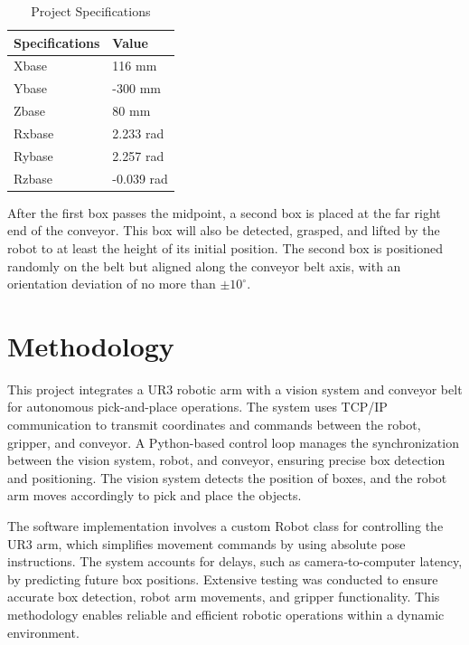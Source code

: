 \documentclass[a4paper, 10pt]{article}
\begin{document}
\renewcommand{\arraystretch}{1.1}
\begin{table}[h]
    \centering
    \caption{Project Specifications}
    \begin{tabular}{|C{7cm}|C{7cm}|}
        \hline
        \textbf{Specifications} & \textbf{Value} \\
        \hline
        Xbase   & 116 mm   \\
        \hline
        Ybase     & -300 mm     \\
        \hline
        Zbase & 80 mm \\
        \hline
        Rxbase   & 2.233 rad   \\
        \hline
        Rybase   & 2.257 rad \\
        \hline
        Rzbase      & -0.039 rad   \\
        \hline
    \end{tabular}
    \label{tab:specs}
\end{table}

After the first box passes the midpoint, a second box is placed at the far right end of the conveyor. This box will also be detected, grasped, and lifted by the robot to at least the height of its initial position. The second box is positioned randomly on the belt but aligned along the conveyor belt axis, with an orientation deviation of no more than $\pm 10^\circ$.

\section{Methodology}
This project integrates a UR3 robotic arm with a vision system and conveyor belt for autonomous pick-and-place operations. The system uses TCP/IP communication to transmit coordinates and commands between the robot, gripper, and conveyor. A Python-based control loop manages the synchronization between the vision system, robot, and conveyor, ensuring precise box detection and positioning. The vision system detects the position of boxes, and the robot arm moves accordingly to pick and place the objects.

The software implementation involves a custom Robot class for controlling the UR3 arm, which simplifies movement commands by using absolute pose instructions. The system accounts for delays, such as camera-to-computer latency, by predicting future box positions. Extensive testing was conducted to ensure accurate box detection, robot arm movements, and gripper functionality. This methodology enables reliable and efficient robotic operations within a dynamic environment.
\end{document}
